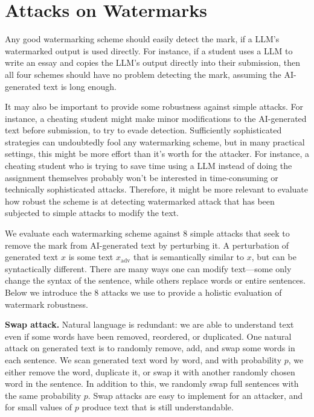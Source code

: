 \section{Attacks on Watermarks}\label{sec:attacks}

Any good watermarking scheme should easily detect the mark,
if a LLM's watermarked output is used directly.
For instance, if a student uses a LLM to write an essay and copies
the LLM's output directly into their submission, then all four
schemes should have no problem detecting the mark, assuming the
AI-generated text is long enough.

It may also be important to provide some robustness against
simple attacks.
For instance, a cheating student might make minor modifications
to the AI-generated text before submission, to try to evade detection.
Sufficiently sophisticated strategies can undoubtedly fool
any watermarking scheme, but in many practical settings, this
might be more effort than it's worth for the attacker.
For instance, a cheating student who is trying to save time
using a LLM instead of doing the assignment themselves
probably won't be interested in time-consuming or technically
sophisticated attacks.
Therefore, it might be more relevant to evaluate how robust the
scheme is at detecting watermarked attack that has been subjected
to simple attacks to modify the text.

We evaluate each watermarking scheme against 8 simple attacks
that seek to remove the mark from AI-generated text by perturbing it.
A perturbation of generated text $x$ is some text $x_{\mathrm{adv}}$ that is 
semantically similar to $x$, but can be syntactically different.
%
%
There are many ways one can modify text---some only change the syntax of the sentence, while others replace words or entire sentences.
%
Below we introduce the 8 attacks we use to provide a holistic evaluation of watermark robustness.

\smallskip\noindent\textbf{Swap attack.} 
%
Natural language is redundant: we are able to understand text even if some words have been removed, reordered, or duplicated.
%
One natural attack on generated text is to randomly remove, add, and swap some words in each sentence.
%
We scan generated text word by word, and with probability $p$, we either remove the word, duplicate it, or swap it with another randomly 
chosen word in the sentence.
%
In addition to this, we randomly swap full sentences with the same probability $p$.
%
Swap attacks are easy to implement for an attacker, and for small values of $p$ produce text that is still understandable.

